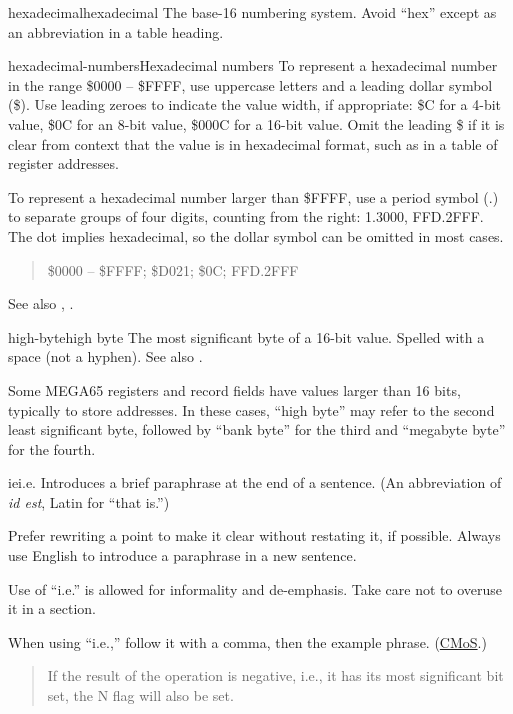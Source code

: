 \begin{sgentry}{hexadecimal}{hexadecimal}
    The base-16 numbering system. Avoid ``hex'' except as an abbreviation in a table heading.
\end{sgentry}

\begin{sgentry}{hexadecimal-numbers}{Hexadecimal numbers}
    To represent a hexadecimal number in the range \$0000 -- \$FFFF, use uppercase letters and a leading dollar symbol (\$). Use leading zeroes to indicate the value width, if appropriate: \$C for a 4-bit value, \$0C for an 8-bit value, \$000C for a 16-bit value. Omit the leading \$ if it is clear from context that the value is in hexadecimal format, such as in a table of register addresses.

    To represent a hexadecimal number larger than \$FFFF, use a period symbol (.) to separate groups of four digits, counting from the right: 1.3000, FFD.2FFF. The dot implies hexadecimal, so the dollar symbol can be omitted in most cases.

    \begin{quote}
        \$0000 -- \$FFFF; \$D021; \$0C; FFD.2FFF
    \end{quote}

    See also , .
\end{sgentry}

\begin{sgentry}{high-byte}{high byte}
    The most significant byte of a 16-bit value. Spelled with a space (not a hyphen). See also .

    Some MEGA65 registers and record fields have values larger than 16 bits, typically to store addresses. In these cases, ``high byte'' may refer to the second least significant byte, followed by ``bank byte'' for the third and ``megabyte byte'' for the fourth.
\end{sgentry}

\begin{sgentry}{ie}{i.e.}
    Introduces a brief paraphrase at the end of a sentence. (An abbreviation of \emph{id est}, Latin for ``that is.'')

    Prefer rewriting a point to make it clear without restating it, if possible. Always use English to introduce a paraphrase in a new sentence.

    Use of ``i.e.'' is allowed for informality and de-emphasis. Take care not to overuse it in a section.

    When using ``i.e.,'' follow it with a comma, then the example phrase. (\href{https://www.chicagomanualofstyle.org/qanda/data/faq/topics/Abbreviations/faq0047.html}{CMoS}.)

    \begin{quote}
        If the result of the operation is negative, i.e., it has its most significant bit set, the N flag will also be set.
    \end{quote}
\end{sgentry}

